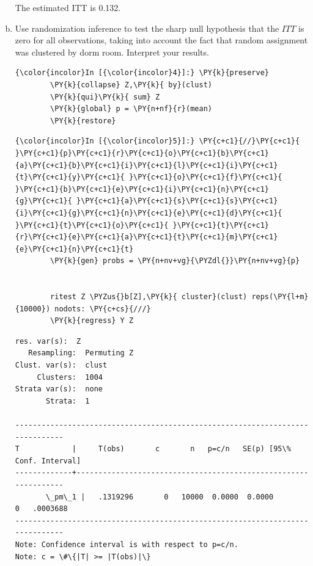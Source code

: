 \documentclass[11pt,notitlepage]{article}\usepackage[]{graphicx}\usepackage[]{color}
\makeatletter
\newenvironment{kframe}{%
 \def\at@end@of@kframe{}%
 \ifinner\ifhmode%
  \def\at@end@of@kframe{\end{minipage}}%
  \begin{minipage}{\columnwidth}%
 \fi\fi%
 \def\FrameCommand##1{\hskip\@totalleftmargin \hskip-\fboxsep
 \colorbox{shadecolor}{##1}\hskip-\fboxsep
     \hskip-\linewidth \hskip-\@totalleftmargin \hskip\columnwidth}%
 \MakeFramed {\advance\hsize-\width
   \@totalleftmargin\z@ \linewidth\hsize
   \@setminipage}}%
 {\par\unskip\endMakeFramed%
 \at@end@of@kframe}
\newenvironment{knitrout}{}{} %
\makeatother
\begin{document}
\begin{enumerate}[a)]
The estimated ITT is 0.132.

\item Use randomization inference to test the sharp null hypothesis that the $ITT$ is zero for all observations, taking into account the fact that random assignment was clustered by dorm room. Interpret your results.
\begin{knitrout}
\color{fgcolor}\begin{kframe}
   \begin{Verbatim}[commandchars=\\\{\}]
{\color{incolor}In [{\color{incolor}4}]:} \PY{k}{preserve}
        \PY{k}{collapse} Z,\PY{k}{ by}(clust)   
        \PY{k}{qui}\PY{k}{ sum} Z
        \PY{k}{global} p = \PY{n+nf}{r}(mean)
        \PY{k}{restore}
\end{Verbatim}

    \begin{Verbatim}[commandchars=\\\{\}]
{\color{incolor}In [{\color{incolor}5}]:} \PY{c+c1}{//}\PY{c+c1}{ }\PY{c+c1}{p}\PY{c+c1}{r}\PY{c+c1}{o}\PY{c+c1}{b}\PY{c+c1}{a}\PY{c+c1}{b}\PY{c+c1}{i}\PY{c+c1}{l}\PY{c+c1}{i}\PY{c+c1}{t}\PY{c+c1}{y}\PY{c+c1}{ }\PY{c+c1}{o}\PY{c+c1}{f}\PY{c+c1}{ }\PY{c+c1}{b}\PY{c+c1}{e}\PY{c+c1}{i}\PY{c+c1}{n}\PY{c+c1}{g}\PY{c+c1}{ }\PY{c+c1}{a}\PY{c+c1}{s}\PY{c+c1}{s}\PY{c+c1}{i}\PY{c+c1}{g}\PY{c+c1}{n}\PY{c+c1}{e}\PY{c+c1}{d}\PY{c+c1}{ }\PY{c+c1}{t}\PY{c+c1}{o}\PY{c+c1}{ }\PY{c+c1}{t}\PY{c+c1}{r}\PY{c+c1}{e}\PY{c+c1}{a}\PY{c+c1}{t}\PY{c+c1}{m}\PY{c+c1}{e}\PY{c+c1}{n}\PY{c+c1}{t}
        \PY{k}{gen} probs = \PY{n+nv+vg}{\PYZdl{}}\PY{n+nv+vg}{p}
        
        
        ritest Z \PYZus{}b[Z],\PY{k}{ cluster}(clust) reps(\PY{l+m}{10000}) nodots: \PY{c+cs}{///}
        \PY{k}{regress} Y Z
\end{Verbatim}

    \begin{Verbatim}[commandchars=\\\{\}]
  res. var(s):  Z
   Resampling:  Permuting Z
Clust. var(s):  clust
     Clusters:  1004
Strata var(s):  none
       Strata:  1

------------------------------------------------------------------------------
T            |     T(obs)       c       n   p=c/n   SE(p) [95\% Conf. Interval]
-------------+----------------------------------------------------------------
       \_pm\_1 |   .1319296       0   10000  0.0000  0.0000         0   .0003688
------------------------------------------------------------------------------
Note: Confidence interval is with respect to p=c/n.
Note: c = \#\{|T| >= |T(obs)|\}


\end{Verbatim}
\end{kframe}
\end{knitrout}
\end{enumerate}
\end{document}
